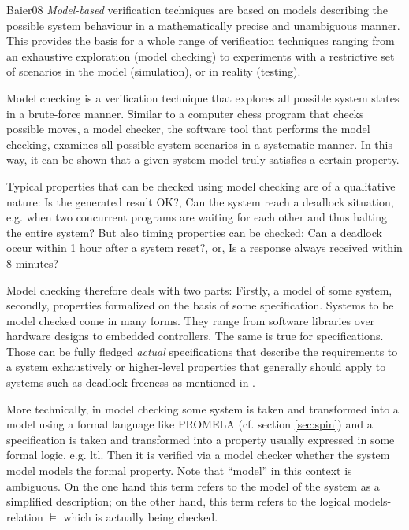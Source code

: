 \begin{displaycquote}[p.7ff.]{Baier08}
    \textit{Model-based} verification techniques are based on models describing the possible system behaviour in a mathematically precise and unambiguous manner. \textelp{}
    This provides the basis for a whole range of verification techniques ranging from an exhaustive exploration (model checking) to experiments with a restrictive set of scenarios in the model (simulation), or in reality (testing). \textelp{}

    Model checking is a verification technique that explores all possible system states in a brute-force manner.
    Similar to a computer chess program that checks possible moves, a model checker, the software tool that performs the model checking, examines all possible system scenarios in a systematic manner.
    In this way, it can be shown that a given system model truly satisfies a certain property. \textelp{}

    Typical properties that can be checked using model checking are of a qualitative nature:
    Is the generated result OK?,
    Can the system reach a deadlock situation, e.g. when two concurrent programs are waiting for each other and thus halting the entire system?
    But also timing properties can be checked:
    Can a deadlock occur within 1 hour after a system reset?, or, Is a response always received within 8 minutes?
\end{displaycquote}

Model checking therefore deals with two parts: Firstly, a model of some system, secondly, properties formalized on the basis of some specification.
Systems to be model checked come in many forms.
They range from software libraries over hardware designs to embedded controllers.
The same is true for specifications.
Those can be fully fledged \textit{actual} specifications that describe the requirements to a system exhaustively or higher-level properties that generally should apply to systems such as deadlock freeness as mentioned in \cite{Baier08}.

More technically, in model checking some system is taken and transformed into a model using a formal language like PROMELA (cf. section \ref{sec:spin}) and a specification is taken and transformed into a property usually expressed in some formal logic, e.g. \gls{ltl}.
Then it is verified via a model checker whether the system model models the formal property.
Note that \enquote{model} in this context is ambiguous.
On the one hand this term refers to the model of the system as a simplified description; on the other hand, this term refers to the logical models-relation $ \models $ which is actually being checked.

